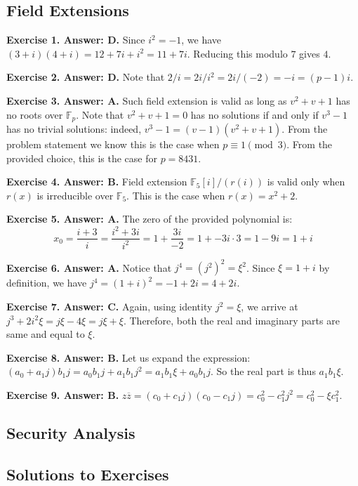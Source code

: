 \documentclass[../../book]{subfiles}
\begin{document}
\subsection*{Field Extensions}

\textbf{Exercise 1. Answer: D.} Since $i^2=-1$, we have
$(3+i)(4+i)=12+7i+i^2=11+7i$. Reducing this modulo $7$ gives $4$.

\textbf{Exercise 2. Answer: D.} Note that $2/i=2i/i^2=2i/(-2)=-i=(p-1)i$. 

\textbf{Exercise 3. Answer: A.} Such field extension is valid as long as $v^2+v+1$
has no roots over $\mathbb{F}_p$. Note that $v^2+v+1=0$ has no solutions if and
only if $v^3-1$ has no trivial solutions: indeed, $v^3-1=(v-1)(v^2+v+1)$. From
the problem statement we know this is the case when $p \equiv 1 \pmod{3}$. From 
the provided choice, this is the case for $p=8431$.

\textbf{Exercise 4. Answer: B.} Field extension $\mathbb{F}_5[i]/(r(i))$
is valid only when $r(x)$ is irreducible over $\mathbb{F}_5$. This is the 
case when $r(x) = x^2+2$.

\textbf{Exercise 5. Answer: A.} The zero of the provided polynomial is:
\begin{equation*}
    x_0 = \frac{i+3}{i} = \frac{i^2+3i}{i^2} = 1 + \frac{3i}{-2} = 1 + -3i \cdot 3 = 1-9i=1+i
\end{equation*}

\textbf{Exercise 6. Answer: A.} Notice that $j^4=(j^2)^2=\xi^2$. Since $\xi=1+i$
by definition, we have $j^4=(1+i)^2=-1+2i=4+2i$.

\textbf{Exercise 7. Answer: C.} Again, using identity $j^2=\xi$, we arrive at 
$j^3+2i^2\xi = j\xi-4\xi = j\xi+\xi$. Therefore, both the real and imaginary 
parts are same and equal to $\xi$.

\textbf{Exercise 8. Answer: B.} Let us expand the expression: $(a_0+a_1j)b_1j=
a_0b_1j+a_1b_1j^2=a_1b_1\xi+a_0b_1j$. So the real part is thus $a_1b_1\xi$.

\textbf{Exercise 9. Answer: B.} $z\overline{z}=(c_0+c_1j)(c_0-c_1j) = c_0^2-c_1^2j^2=c_0^2-\xi c_1^2$.

\subsection*{Security Analysis}

\subsection*{Solutions to Exercises}
\end{document}

